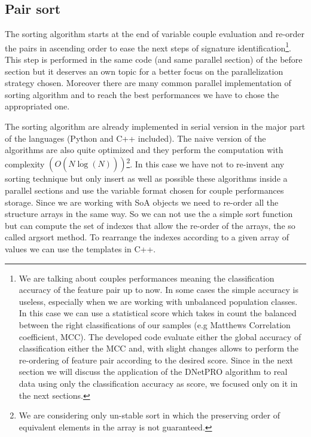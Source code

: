 \documentclass{standalone}
\begin{document}
\subsection[Sorting]{Pair sort}\label{implementation:sort}

The sorting algorithm starts at the end of variable couple evaluation and re-order the pairs in ascending order to ease the next steps of signature identification\footnote{
  We are talking about couples performances meaning the classification accuracy of the feature pair up to now.
  In some cases the simple accuracy is useless, especially when we are working with unbalanced population classes.
  In this case we can use a statistical score which takes in count the balanced between the right classifications of our samples (e.g Matthews Correlation coefficient, MCC).
  The developed code evaluate either the global accuracy of classification either the MCC and, with slight changes allows to perform the re-ordering of feature pair according to the desired score.
  Since in the next section we will discuss the application of the DNetPRO algorithm to real data using only the classification accuracy as score, we focused only on it in the next sections.
}.
This step is performed in the same code (and same parallel section) of the before section but it deserves an own topic for a better focus on the parallelization strategy chosen.
Moreover there are many common parallel implementation of sorting algorithm and to reach the best performances we have to chose the appropriated one.

The sorting algorithm are already implemented in serial version in the major part of the languages (\textsf{Python} and \textsf{C++} included).
The naive version of the algorithms are also quite optimized and they perform the computation with complexity $(O(N\dot\log(N)))$\footnote{
  We are considering only un-stable sort in which the preserving order of equivalent elements in the array is not guaranteed.
}.
In this case we have not to re-invent any sorting technique but only insert as well as possible these algorithms inside a parallel sections and use the variable format chosen for couple performances storage.
Since we are working with SoA objects we need to re-order all the structure arrays in the same way.
So we can not use the a simple sort function but can compute the set of indexes that allow the re-order of the arrays, the so called \textsf{argsort} method.
To rearrange the indexes according to a given array of values we can use the templates in \textsf{C++}.
\end{document}
